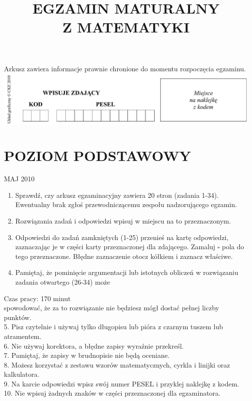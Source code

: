 \documentclass[10pt]{article}
\title{EGZAMIN MATURALNY \\
 Z MATEMATYKI }
\author{}
\date{}
\begin{document}
\maketitle
Arkusz zawiera informacje prawnie chronione do momentu rozpoczęcia egzaminu.\\
\includegraphics[max width=\textwidth, center]{2024_11_21_caf6b2e64dd65c9b24eeg-01}

\section*{POZIOM PODSTAWOWY}
MAJ 2010

\begin{enumerate}
  \item Sprawdź, czy arkusz egzaminacyjny zawiera 20 stron (zadania 1-34). Ewentualny brak zgłoś przewodniczącemu zespołu nadzorującego egzamin.
  \item Rozwiązania zadań i odpowiedzi wpisuj w miejscu na to przeznaczonym.
  \item Odpowiedzi do zadań zamkniętych (1-25) przenieś na kartę odpowiedzi, zaznaczając je w części karty przeznaczonej dla zdającego. Zamaluj \(\square\) pola do tego przeznaczone. Błędne zaznaczenie otocz kółkiem i zaznacz właściwe.
  \item Pamiętaj, że pominięcie argumentacji lub istotnych obliczeń w rozwiązaniu zadania otwartego (26-34) może
\end{enumerate}

Czas pracy: 170 minut\\
spowodować, że za to rozwiązanie nie będziesz mógł dostać pełnej liczby punktów.\\
5. Pisz czytelnie i używaj tylko długopisu lub pióra z czarnym tuszem lub atramentem.\\
6. Nie używaj korektora, a błędne zapisy wyraźnie przekreśl.\\
7. Pamiętaj, że zapisy w brudnopisie nie będą oceniane.\\
8. Możesz korzystać z zestawu wzorów matematycznych, cyrkla i linijki oraz kalkulatora.\\
9. Na karcie odpowiedzi wpisz swój numer PESEL i przyklej naklejkę z kodem.\\
10. Nie wpisuj żadnych znaków w części przeznaczonej dla egzaminatora.
\end{document}
